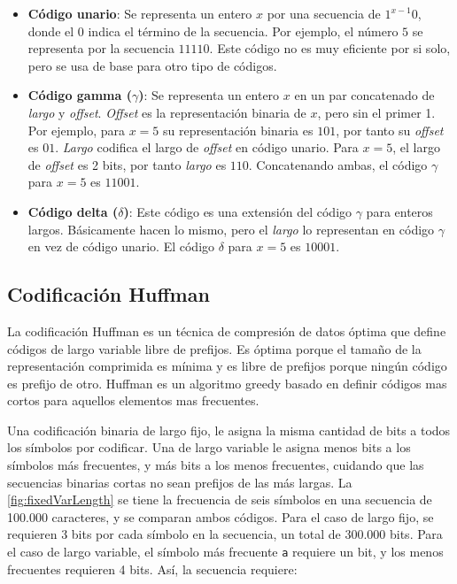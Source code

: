 \begin{itemize}
	\item \textbf{Código unario}: Se representa un entero $x$ por una secuencia de $1^{x-1}0$, donde el $0$ indica el término de la secuencia. Por ejemplo, el número $5$ se representa por la secuencia $11110$. Este código no es muy eficiente por si solo, pero se usa de base para otro tipo de códigos.
	
	\item \textbf{Código gamma ($\gamma$)}: Se representa un entero $x$ en un par concatenado de \textit{largo} y \textit{offset}. \textit{Offset} es la representación binaria de $x$, pero sin el primer 1. Por ejemplo, para $x=5$ su representación binaria es $101$, por tanto su \textit{offset} es $01$. \textit{Largo} codifica el largo de \textit{offset} en código unario. Para $x=5$, el largo de \textit{offset} es 2 bits, por tanto \textit{largo} es $110$. Concatenando ambas, el código $\gamma$ para $x=5$ es $11001$.
	
	\item \textbf{Código delta ($\delta$)}: Este código es una extensión del código $\gamma$ para enteros largos. Básicamente hacen lo mismo, pero el \textit{largo} lo representan en código $\gamma$ en vez de código unario. El código $\delta$ para $x=5$ es $10001$.
\end{itemize}

\subsection{Codificación Huffman}\label{sec:huffman}
La codificación Huffman\cite{huffman1952method} es un técnica de compresión de datos óptima que define códigos de largo variable libre de prefijos. Es óptima porque el tamaño de la representación comprimida es mínima y es libre de prefijos porque ningún código es prefijo de otro. Huffman es un algoritmo greedy basado en definir códigos mas cortos para aquellos elementos mas frecuentes. 

Una codificación binaria de largo fijo, le asigna la misma cantidad de bits a todos los símbolos por codificar. Una de largo variable le asigna menos bits a los símbolos más frecuentes, y más bits a los menos frecuentes, cuidando que las secuencias binarias cortas no sean prefijos de las más largas. La \autoref{fig:fixedVarLength} se tiene la frecuencia de seis símbolos en una secuencia de 100.000 caracteres, y se comparan ambos códigos. Para el caso de largo fijo, se requieren 3 bits por cada símbolo en la secuencia, un total de 300.000 bits. Para el caso de largo variable, el símbolo más frecuente \texttt{a} requiere un bit, y los menos frecuentes requieren 4 bits. Así, la secuencia requiere:

